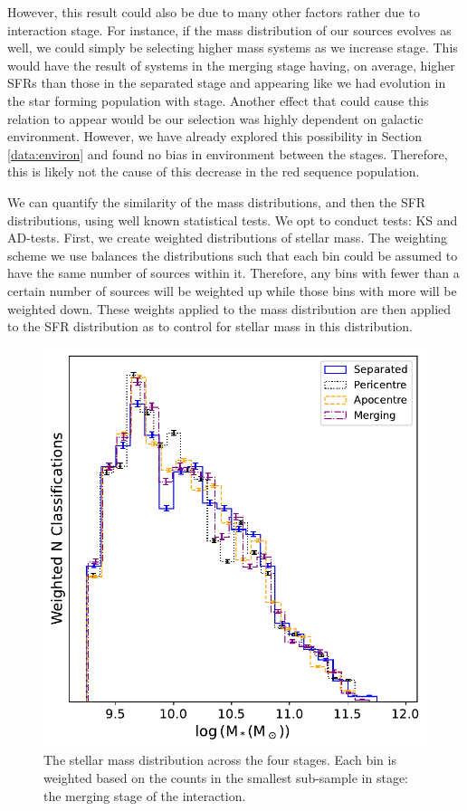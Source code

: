However, this result could also be due to many other factors rather due to interaction stage. For instance, if the mass distribution of our sources evolves as well, we could simply be selecting higher mass systems as we increase stage. This would have the result of systems in the merging stage having, on average, higher SFRs than those in the separated stage and appearing like we had evolution in the star forming population with stage. Another effect that could cause this relation to appear would be our selection was highly dependent on galactic environment. However, we have already explored this possibility in Section \ref{data:environ} and found no bias in environment between the stages. Therefore, this is likely not the cause of this decrease in the red sequence population.

We can quantify the similarity of the mass distributions, and then the SFR distributions, using well known statistical tests. We opt to conduct tests: KS and AD-tests. First, we create weighted distributions of stellar mass. The weighting scheme we use balances the distributions such that each bin could be assumed to have the same number of sources within it. Therefore, any bins with fewer than a certain number of sources will be weighted up while those bins with more will be weighted down. These weights applied to the mass distribution are then applied to the SFR distribution as to control for stellar mass in this distribution.

\begin{figure}
\centering
\includegraphics[width = \textwidth]{Chapter3/figures/stellar-mass-dist.pdf}
\caption[The stellar mass distribution across the four stages.]{The stellar mass distribution across the four stages. Each bin is weighted based on the counts in the smallest sub-sample in stage: the merging stage of the interaction.}
\label{fig:weighted-mass}
\end{figure}


